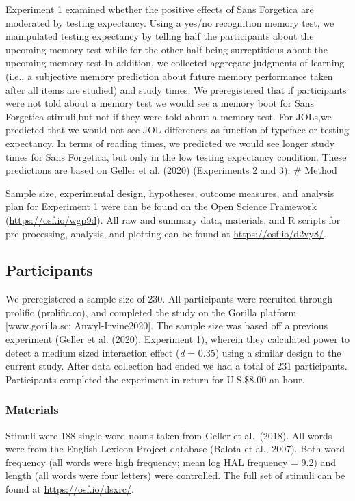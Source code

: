 \documentclass[
  english,
  man]{apa6}
\begin{document}
Experiment 1 examined whether the positive effects of Sans Forgetica are moderated by testing expectancy. Using a yes/no recognition memory test, we manipulated testing expectancy by telling half the participants about the upcoming memory test while for the other half being surreptitious about the upcoming memory test.In addition, we collected aggregate judgments of learning (i.e., a subjective memory prediction about future memory performance taken after all items are studied) and study times. We preregistered that if participants were not told about a memory test we would see a memory boot for Sans Forgetica stimuli,but not if they were told about a memory test. For JOLs,we predicted that we would not see JOL differences as function of typeface or testing expectancy. In terms of reading times, we predicted we would see longer study times for Sans Forgetica, but only in the low testing expectancy condition. These predictions are based on Geller et al. (2020) (Experiments 2 and 3).
\# Method

Sample size, experimental design, hypotheses, outcome measures, and analysis plan for Experiment 1 were can be found on the Open Science Framework (\url{https://osf.io/wgp9d}). All raw and summary data, materials, and R scripts for pre-processing, analysis, and plotting can be found at \url{https://osf.io/d2vy8/}.

\hypertarget{participants}{%
\subsection{Participants}\label{participants}}

We preregistered a sample size of 230. All participants were recruited through prolific (prolific.co), and completed the study on the Gorilla platform {[}www.gorilla.sc; Anwyl-Irvine2020{]}. The sample size was based off a previous experiment (Geller et al. (2020), Experiment 1), wherein they calculated power to detect a medium sized interaction effect (\emph{d} = 0.35) using a similar design to the current study. After data collection had ended we had a total of 231 participants. Participants completed the experiment in return for U.S.\$8.00 an hour.

\hypertarget{materials}{%
\subsubsection{Materials}\label{materials}}

Stimuli were 188 single-word nouns taken from Geller et al.~(2018). All words were from the English Lexicon Project database (Balota et al., 2007). Both word frequency (all words were high frequency; mean log HAL frequency = 9.2) and length (all words were four letters) were controlled. The full set of stimuli can be found at \url{https://osf.io/dsxrc/}.
\end{document}
